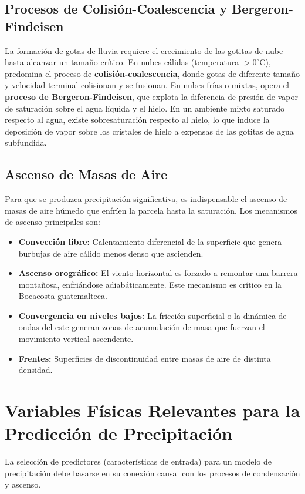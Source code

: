 \documentclass[titlepage,11pt]{report}
\begin{document}
\subsection{Procesos de Colisión-Coalescencia y Bergeron-Findeisen}
La formación de gotas de lluvia requiere el crecimiento de las gotitas de nube hasta alcanzar un tamaño crítico. En nubes cálidas (temperatura \(> 0^\circ\)C), predomina el proceso de \textbf{colisión-coalescencia}, donde gotas de diferente tamaño y velocidad terminal colisionan y se fusionan. En nubes frías o mixtas, opera el \textbf{proceso de Bergeron-Findeisen}, que explota la diferencia de presión de vapor de saturación sobre el agua líquida y el hielo. En un ambiente mixto saturado respecto al agua, existe sobresaturación respecto al hielo, lo que induce la deposición de vapor sobre los cristales de hielo a expensas de las gotitas de agua subfundida.

\subsection{Ascenso de Masas de Aire}
Para que se produzca precipitación significativa, es indispensable el ascenso de masas de aire húmedo que enfríen la parcela hasta la saturación. Los mecanismos de ascenso principales son:
\begin{itemize}
    \item \textbf{Convección libre:} Calentamiento diferencial de la superficie que genera burbujas de aire cálido menos denso que ascienden.
    \item \textbf{Ascenso orográfico:} El viento horizontal es forzado a remontar una barrera montañosa, enfriándose adiabáticamente. Este mecanismo es crítico en la Bocacosta guatemalteca.
    \item \textbf{Convergencia en niveles bajos:} La fricción superficial o la dinámica de ondas del este generan zonas de acumulación de masa que fuerzan el movimiento vertical ascendente.
    \item \textbf{Frentes:} Superficies de discontinuidad entre masas de aire de distinta densidad.
\end{itemize}

\section{Variables Físicas Relevantes para la Predicción de Precipitación}

La selección de predictores (características de entrada) para un modelo de precipitación debe basarse en su conexión causal con los procesos de condensación y ascenso.
\end{document}
